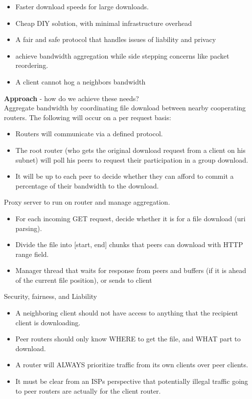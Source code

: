 \documentclass{article}
\begin{document}
		\begin{itemize}
			\item Faster download speeds for large downloads.
			\item Cheap DIY solution, with minimal infrastructure overhead
			\item A fair and safe protocol that handles issues of liability and privacy
			\item achieve bandwidth aggregation while side stepping concerns like packet reordering.
			\item A client cannot hog a neighbors bandwidth
		\end{itemize}
	{\bf Approach} - how do we achieve these needs?\\
		Aggregate bandwidth by coordinating file download between nearby cooperating routers. The following will occur on a per request basis:
		\begin{itemize}
			\item Routers will communicate via a defined protocol.
			\item The root router (who gets the original download request from a client on his subnet) will poll his peers to request their participation in a group download.
			\item It will be up to each peer to decide whether they can afford to commit a percentage of their bandwidth to the download.
		\end{itemize}
		Proxy server to run on router and manage aggregation. 
		\begin{itemize}
			\item For each incoming GET request, decide whether it is for a file download (uri parsing). 
			\item Divide the file into [start, end] chunks that peers can download with HTTP range field.
			\item Manager thread that waits for response from peers and buffers (if it is ahead of the current file position), or sends to client
		\end{itemize}
		Security, fairness, and Liability
		\begin{itemize}
			\item A neighboring client should not have access to anything that the recipient client is downloading.
			\item Peer routers should only know WHERE to get the file, and WHAT part to download.
			\item A router will ALWAYS prioritize traffic from its own clients over peer clients.
			\item It must be clear from an ISPs perspective that potentially illegal traffic going to peer routers are actually for the client router.
		\end{itemize}
\end{document}
